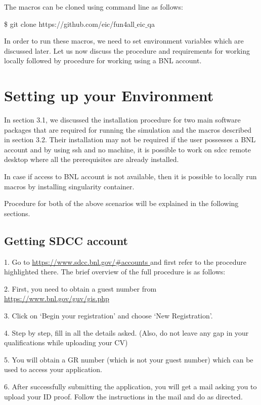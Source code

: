 The macros can be cloned using command line as follows:

\$ git clone https://github.com/eic/fun4all$\_$eic$\_$qa

In order to run these macros, we need to set environment variables which are discussed later. Let us now discuss the procedure and requirements for working locally followed by procedure for working using a BNL account.

\section{Setting up your Environment}
In section 3.1, we discussed the installation procedure for two main software packages that are required for running the simulation and the macros described in section 3.2. Their installation may not be required if the user possesses a BNL account and by using ssh and no machine, it is possible to work on sdcc remote desktop where all the prerequisites are already installed. 

In case if access to BNL account is not available, then it is possible to locally run macros by installing singularity container.

Procedure for both of the above scenarios will be explained in the following sections.




\subsection{Getting SDCC account}
1. Go to \href{https://www.sdcc.bnl.gov/#accounts}{ https://www.sdcc.bnl.gov/\#accounts } and first refer to the procedure highlighted there. The brief overview of the full procedure is as follows:

2. First, you need to obtain a guest number from \href{https://www.bnl.gov/guv/gis.php}{https://www.bnl.gov/guv/gis.php}

3. Click on ‘Begin your registration’ and choose ‘New Registration’.

4. Step by step, fill in all the details asked. (Also, do not leave any gap in your qualifications while uploading your CV)

5. You will obtain a GR number (which is not your guest number) which can be used to access your application.

6. After successfully submitting the application, you will get a mail asking you to upload your ID proof. Follow the instructions in the mail and do as directed.


